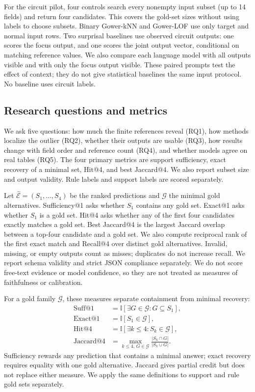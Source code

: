 \documentclass[conference]{IEEEtran}
\begin{document}
For the circuit pilot, four controls search every nonempty input subset (up to 14 fields) and return four candidates. This covers the gold-set sizes without using labels to choose subsets. Binary Gower-kNN and Gower-LOF use only target and normal input rows. Two surprisal baselines use observed circuit outputs: one scores the focus output, and one scores the joint output vector, conditional on matching reference values. We also compare each language model with all outputs visible and with only the focus output visible. These paired prompts test the effect of context; they do not give statistical baselines the same input protocol. No baseline uses circuit labels.

\subsection{Research questions and metrics}
We ask five questions: how much the finite references reveal (RQ1), how methods localize the outlier (RQ2), whether their outputs are usable (RQ3), how results change with field order and reference count (RQ4), and whether models agree on real tables (RQ5). The four primary metrics are support sufficiency, exact recovery of a minimal set, Hit@4, and best Jaccard@4. We also report subset size and output validity. Rule labels and support labels are scored separately.

Let $\widehat{\mathcal E}=(S_1,\ldots,S_4)$ be the ranked predictions and $\mathcal G$ the minimal gold alternatives. Sufficiency@1 asks whether $S_1$ contains any gold set. Exact@1 asks whether $S_1$ is a gold set. Hit@4 asks whether any of the first four candidates exactly matches a gold set. Best Jaccard@4 is the largest Jaccard overlap between a top-four candidate and a gold set. We also compute reciprocal rank of the first exact match and Recall@4 over distinct gold alternatives. Invalid, missing, or empty outputs count as misses; duplicates do not increase recall. We report schema validity and strict JSON compliance separately. We do not score free-text evidence or model confidence, so they are not treated as measures of faithfulness or calibration.

For a gold family $\mathcal G$, these measures separate containment from minimal recovery:
\begin{align}
\mathrm{Suff@1} &= \mathbb{I}\!\left[\exists G\in\mathcal G: G\subseteq S_1\right], \\
\mathrm{Exact@1} &= \mathbb{I}[S_1\in\mathcal G], \\
\mathrm{Hit@4} &= \mathbb{I}\!\left[\exists k\leq4: S_k\in\mathcal G\right], \\
\mathrm{Jaccard@4} &= \max_{k\leq4,\,G\in\mathcal G}
\frac{|S_k\cap G|}{|S_k\cup G|}.
\end{align}
Sufficiency rewards any prediction that contains a minimal answer; exact recovery requires equality with one gold alternative. Jaccard gives partial credit but does not replace either measure. We apply the same definitions to support and rule gold sets separately.
\end{document}
